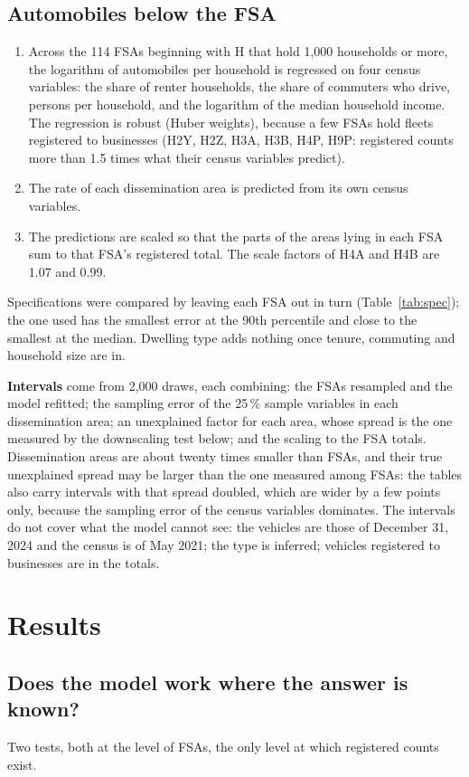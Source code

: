\documentclass[11pt,a4paper]{article}
\begin{document}
\subsection{Automobiles below the FSA}
\begin{enumerate}
\item Across the 114 FSAs beginning with H that hold 1{,}000 households or more, the logarithm of automobiles per household is regressed on four census variables: the share of renter households, the share of commuters who drive, persons per household, and the logarithm of the median household income. The regression is robust (Huber weights), because a few FSAs hold fleets registered to businesses (H2Y, H2Z, H3A, H3B, H4P, H9P: registered counts more than 1.5 times what their census variables predict).
\item The rate of each dissemination area is predicted from its own census variables.
\item The predictions are scaled so that the parts of the areas lying in each FSA sum to that FSA\textquoteright{}s registered total. The scale factors of H4A and H4B are 1.07 and 0.99.
\end{enumerate}
Specifications were compared by leaving each FSA out in turn (Table~\ref{tab:spec}); the one used has the smallest error at the 90th percentile and close to the smallest at the median. Dwelling type adds nothing once tenure, commuting and household size are in.

\textbf{Intervals} come from 2{,}000 draws, each combining: the FSAs resampled and the model refitted; the sampling error of the 25\,\% sample variables in each dissemination area; an unexplained factor for each area, whose spread is the one measured by the downscaling test below; and the scaling to the FSA totals. Dissemination areas are about twenty times smaller than FSAs, and their true unexplained spread may be larger than the one measured among FSAs: the tables also carry intervals with that spread doubled, which are wider by a few points only, because the sampling error of the census variables dominates. The intervals do not cover what the model cannot see: the vehicles are those of December 31, 2024 and the census is of May 2021; the type is inferred; vehicles registered to businesses are in the totals.

\section{Results}
\subsection{Does the model work where the answer is known?}
Two tests, both at the level of FSAs, the only level at which registered counts exist.
\end{document}
